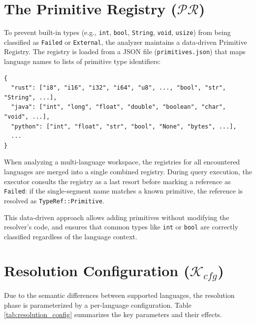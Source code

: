 \section{The Primitive Registry ($\mathcal{PR}$)}
\label{sec:primitive_registry}

To prevent built-in types (e.g., \texttt{int}, \texttt{bool},
\texttt{String}, \texttt{void}, \texttt{usize}) from being classified
as \texttt{Failed} or \texttt{External}, the analyzer maintains a
data-driven Primitive Registry. The registry is loaded from a JSON
file (\texttt{primitives.json}) that maps language names to lists of
primitive type identifiers:

\begin{verbatim}
{
  "rust": ["i8", "i16", "i32", "i64", "u8", ..., "bool", "str", "String", ...],
  "java": ["int", "long", "float", "double", "boolean", "char", "void", ...],
  "python": ["int", "float", "str", "bool", "None", "bytes", ...],
  ...
}
\end{verbatim}

When analyzing a multi-language workspace, the registries for all
encountered languages are merged into a single combined registry.
During query execution, the executor consults the registry as a last
resort before marking a reference as \texttt{Failed}: if the
single-segment name matches a known primitive, the reference is
resolved as \texttt{TypeRef::Primitive}.

This data-driven approach allows adding primitives without modifying
the resolver's code, and ensures that common types like \texttt{int}
or \texttt{bool} are correctly classified regardless of the language context.

\section{Resolution Configuration ($\mathcal{K}_{cfg}$)}
\label{sec:resolution_config}

Due to the semantic differences between supported languages, the
resolution phase is parameterized by a per-language configuration.
Table \ref{tab:resolution_config} summarizes the key parameters and
their effects.

